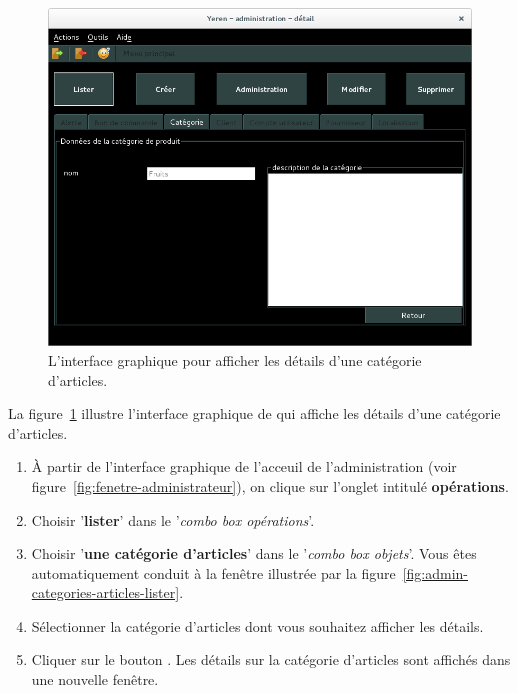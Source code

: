 

\begin{figure}[!htpb]
	\centering
	\includegraphics[scale=0.45]{images/categorie-articles-afficher-details.png}
	\caption{L'interface graphique pour afficher les d\'etails d'une
			cat\'egorie d'articles.}
	\label{fig:admin-categories-articles-afficher-details}
\end{figure}

La figure~\ref{fig:admin-categories-articles-afficher-details}
illustre l'interface graphique de \yeroth qui affiche
les d\'etails d'une cat\'egorie d'articles.

\begin{enumerate}[1)]
	\item \`A partir de l'interface graphique de l'acceuil de
		l'administration (voir figure~\ref{fig:fenetre-administrateur}),
		on clique sur l'onglet intitul\'e \textbf{op\'erations}. 
		
	\item Choisir '\textbf{lister}' dans le '\emph{combo box
		op\'erations}'.
		
	\item Choisir '\textbf{une cat\'egorie d'articles}' dans le
		'\emph{combo box objets}'. Vous \^etes automatiquement
		conduit \`a la fen\^etre illustr\'ee par la
		figure~\ref{fig:admin-categories-articles-lister}.
		
	\item S\'electionner la cat\'egorie d'articles dont vous
		souhaitez afficher les d\'etails.
		
	\item Cliquer sur le bouton . Les d\'etails
		sur la cat\'egorie d'articles sont affich\'es dans une
		nouvelle fen\^etre.
\end{enumerate}

